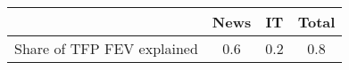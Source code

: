 \begin{small}
	\begin{tabular}{lccc}
	\hline
		& News & IT & Total \\
		\hline
		Share of TFP FEV explained & 0.6 & 0.2 & 0.8 \\
		\hline
	\end{tabular}
\end{small}

